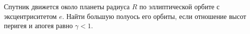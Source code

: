 Спутник движется около планеты радиуса $R$ по эллиптической орбите с эксцентриситетом $e$. Найти большую полуось его орбиты, 
если отношение высот перигея и апогея равно $\gamma < 1$.
